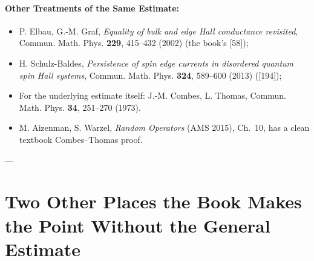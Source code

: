 \paragraph{Other Treatments of the Same Estimate:}
\begin{itemize}
    \item P. Elbau, G.-M. Graf, \textit{Equality of bulk and edge Hall conductance revisited}, Commun. Math. Phys. \textbf{229}, 415--432 (2002) (the book's [58]);
    \item H. Schulz-Baldes, \textit{Persistence of spin edge currents in disordered quantum spin Hall systems}, Commun. Math. Phys. \textbf{324}, 589--600 (2013) ([194]);
    \item For the underlying estimate itself: J.-M. Combes, L. Thomas, Commun. Math. Phys. \textbf{34}, 251--270 (1973).
    \item M. Aizenman, S. Warzel, \textit{Random Operators} (AMS 2015), Ch.~10, has a clean textbook Combes--Thomas proof.
\end{itemize}

---

\section{Two Other Places the Book Makes the Point Without the General Estimate}

